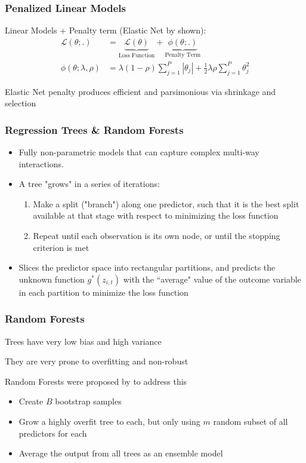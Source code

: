 \documentclass[]{beamer}
\begin{document}

\begin{frame}
\frametitle{Penalized Linear Models}
Linear Models + Penalty term (Elastic Net by \cite{zou_regularization_2005} shown):
	\begin{align}
	\mathcal{L(\theta;.)} &= 
		\underset{\text{Loss Function}}{\underbrace{\mathcal{L(\theta)}}} + 
		\underset{\text{Penalty Term}}{\underbrace{\phi(\theta;.)}} \\
	\phi(\theta;\lambda,\rho) &= 
		\lambda(1-\rho) \sum_{j = 1}^{P}|\theta_j| +
		\frac{1}{2} \lambda \rho \sum_{j = 1}^{P}\theta_j^2
	\end{align}

Elastic Net penalty produces efficient and parsimonious via shrinkage and selection
	
\end{frame}


\begin{frame}
\frametitle{Regression Trees \& Random Forests}
\begin{itemize}
	\item Fully non-parametric models that can capture complex multi-way interactions. 
	\item A tree "grows" in a series of iterations:
	\begin{enumerate}
		\item Make a split ("branch") along one predictor, such that it is the best split available at that stage with respect to minimizing the loss function
		\item Repeat until each observation is its own node, or until the stopping criterion is met
	\end{enumerate}
	\item Slices the predictor space into rectangular partitions, and predicts the unknown function $g^*(z_{i,t})$ with the ``average" value of the outcome variable in each partition to minimize the loss function
\end{itemize}
\end{frame}

\begin{frame}
\frametitle{Random Forests}
Trees have very low bias and high variance

They are very prone to overfitting and non-robust

Random Forests were proposed by \cite{breiman_random_2001} to address this
\begin{itemize}
	\item Create $B$ bootstrap samples
	\item Grow a highly overfit tree to each, but only using $m$ random subset of all predictors for each
	\item Average the output from all trees as an ensemble model
\end{itemize}
\end{frame}
\end{document}

